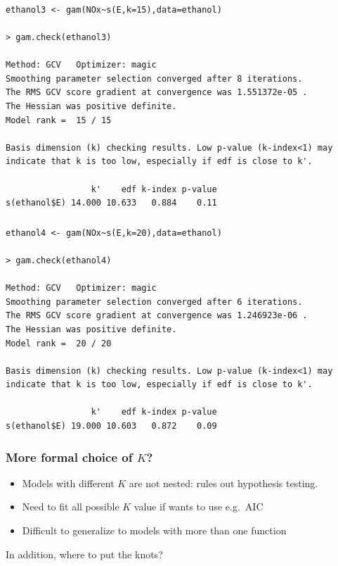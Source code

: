 \documentclass{beamer}
\newcommand{\bs}{\bigskip}
\begin{document}
\begin{frame}[fragile]
\frametitle{}

{\scriptsize
\begin{verbatim}
ethanol3 <- gam(NOx~s(E,k=15),data=ethanol)

> gam.check(ethanol3)

Method: GCV   Optimizer: magic
Smoothing parameter selection converged after 8 iterations.
The RMS GCV score gradient at convergence was 1.551372e-05 .
The Hessian was positive definite.
Model rank =  15 / 15 

Basis dimension (k) checking results. Low p-value (k-index<1) may
indicate that k is too low, especially if edf is close to k'.

                 k'    edf k-index p-value
s(ethanol$E) 14.000 10.633   0.884    0.11

\end{verbatim}
}
\end{frame}


\begin{frame}[fragile]
\frametitle{}

{\scriptsize
\begin{verbatim}
ethanol4 <- gam(NOx~s(E,k=20),data=ethanol)

> gam.check(ethanol4)

Method: GCV   Optimizer: magic
Smoothing parameter selection converged after 6 iterations.
The RMS GCV score gradient at convergence was 1.246923e-06 .
The Hessian was positive definite.
Model rank =  20 / 20 

Basis dimension (k) checking results. Low p-value (k-index<1) may
indicate that k is too low, especially if edf is close to k'.

                 k'    edf k-index p-value
s(ethanol$E) 19.000 10.603   0.872    0.09
\end{verbatim}
}
\end{frame}

\begin{frame}
\frametitle{More formal choice of $K$?}

\begin{itemize}
\item Models with different $K$ are not nested: rules out hypothesis testing.
\item Need to fit all possible $K$ value if wants to use e.g.\ AIC
\item Difficult to generalize to models with more than one function
\end{itemize}

\bs
In addition, where to put the knots?

\end{frame}
\end{document}
